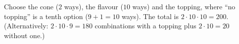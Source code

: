 Choose the cone ($2$ ways), the flavour ($10$ ways) and the topping, where ``no topping'' is a tenth option ($9+1=10$ ways). The total is $2\cdot10\cdot10=\boxed{200}$. (Alternatively: $2\cdot10\cdot9=180$ combinations with a topping plus $2\cdot10=20$ without one.)

